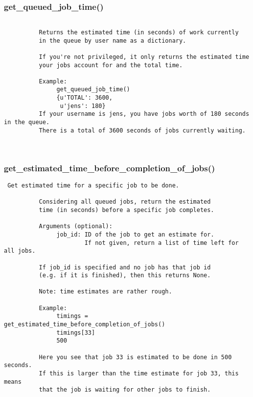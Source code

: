 \subsubsection{get\_queued\_job\_time()}


\begin{verbatim}

          Returns the estimated time (in seconds) of work currently
          in the queue by user name as a dictionary. 

          If you're not privileged, it only returns the estimated time
          your jobs account for and the total time. 
          
          Example:
               get_queued_job_time()
               {u'TOTAL': 3600,
                u'jens': 180}
          If your username is jens, you have jobs worth of 180 seconds in the queue.
          There is a total of 3600 seconds of jobs currently waiting.
          
          
\end{verbatim}
\subsubsection{get\_estimated\_time\_before\_completion\_of\_jobs()}


\begin{verbatim}
 Get estimated time for a specific job to be done.
          
          Considering all queued jobs, return the estimated
          time (in seconds) before a specific job completes.

          Arguments (optional):
               job_id: ID of the job to get an estimate for.
                       If not given, return a list of time left for all jobs.

          If job_id is specified and no job has that job id
          (e.g. if it is finished), then this returns None.

          Note: time estimates are rather rough.

          Example:
               timings = get_estimated_time_before_completion_of_jobs()
               timings[33]
               500

          Here you see that job 33 is estimated to be done in 500 seconds.
          If this is larger than the time estimate for job 33, this means
          that the job is waiting for other jobs to finish.
          
\end{verbatim}
